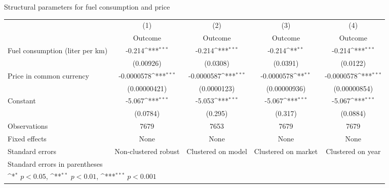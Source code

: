 {
\def\sym#1{\ifmmode^{#1}\else\(^{#1}\)\fi}
\caption{Structural parameters for fuel consumption and price \label{tab:1}}
\begin{tabular*}{\textwidth}{@{\hskip\tabcolsep\extracolsep\fill}l*{4}{c}}
\toprule
                    &\multicolumn{1}{c}{(1)}&\multicolumn{1}{c}{(2)}&\multicolumn{1}{c}{(3)}&\multicolumn{1}{c}{(4)}\\
                    &\multicolumn{1}{c}{Outcome}&\multicolumn{1}{c}{Outcome}&\multicolumn{1}{c}{Outcome}&\multicolumn{1}{c}{Outcome}\\
\midrule
Fuel consumption (liter per km)&      -0.214\sym{***}&      -0.214\sym{***}&      -0.214\sym{**} &      -0.214\sym{***}\\
                    &   (0.00926)         &    (0.0308)         &    (0.0391)         &    (0.0122)         \\
\addlinespace
Price in common currency&  -0.0000578\sym{***}&  -0.0000587\sym{***}&  -0.0000578\sym{**} &  -0.0000578\sym{***}\\
                    &(0.00000421)         & (0.0000123)         &(0.00000936)         &(0.00000854)         \\
\addlinespace
Constant            &      -5.067\sym{***}&      -5.053\sym{***}&      -5.067\sym{***}&      -5.067\sym{***}\\
                    &    (0.0784)         &     (0.295)         &     (0.317)         &    (0.0884)         \\
\midrule
Observations        &        7679         &        7653         &        7679         &        7679         \\
Fixed effects       &        None         &        None         &        None         &        None         \\
Standard errors     &Non-clustered robust         &Clustered on model         &Clustered on market         &Clustered on year         \\
\bottomrule
\multicolumn{5}{l}{\footnotesize Standard errors in parentheses}\\
\multicolumn{5}{l}{\footnotesize \sym{*} \(p<0.05\), \sym{**} \(p<0.01\), \sym{***} \(p<0.001\)}\\
\end{tabular*}
}

